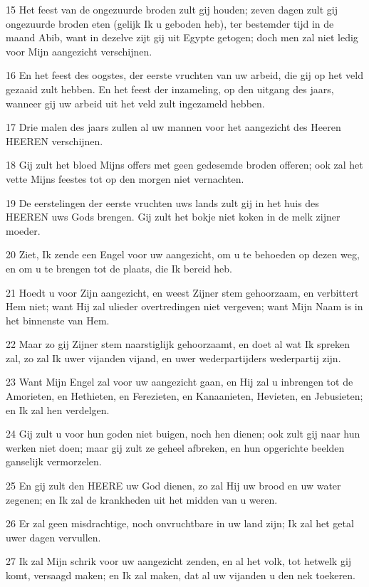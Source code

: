 \par 15 Het feest van de ongezuurde broden zult gij houden; zeven dagen zult gij ongezuurde broden eten (gelijk Ik u geboden heb), ter bestemder tijd in de maand Abib, want in dezelve zijt gij uit Egypte getogen; doch men zal niet ledig voor Mijn aangezicht verschijnen.
\par 16 En het feest des oogstes, der eerste vruchten van uw arbeid, die gij op het veld gezaaid zult hebben. En het feest der inzameling, op den uitgang des jaars, wanneer gij uw arbeid uit het veld zult ingezameld hebben.
\par 17 Drie malen des jaars zullen al uw mannen voor het aangezicht des Heeren HEEREN verschijnen.
\par 18 Gij zult het bloed Mijns offers met geen gedesemde broden offeren; ook zal het vette Mijns feestes tot op den morgen niet vernachten.
\par 19 De eerstelingen der eerste vruchten uws lands zult gij in het huis des HEEREN uws Gods brengen. Gij zult het bokje niet koken in de melk zijner moeder.
\par 20 Ziet, Ik zende een Engel voor uw aangezicht, om u te behoeden op dezen weg, en om u te brengen tot de plaats, die Ik bereid heb.
\par 21 Hoedt u voor Zijn aangezicht, en weest Zijner stem gehoorzaam, en verbittert Hem niet; want Hij zal ulieder overtredingen niet vergeven; want Mijn Naam is in het binnenste van Hem.
\par 22 Maar zo gij Zijner stem naarstiglijk gehoorzaamt, en doet al wat Ik spreken zal, zo zal Ik uwer vijanden vijand, en uwer wederpartijders wederpartij zijn.
\par 23 Want Mijn Engel zal voor uw aangezicht gaan, en Hij zal u inbrengen tot de Amorieten, en Hethieten, en Ferezieten, en Kanaanieten, Hevieten, en Jebusieten; en Ik zal hen verdelgen.
\par 24 Gij zult u voor hun goden niet buigen, noch hen dienen; ook zult gij naar hun werken niet doen; maar gij zult ze geheel afbreken, en hun opgerichte beelden ganselijk vermorzelen.
\par 25 En gij zult den HEERE uw God dienen, zo zal Hij uw brood en uw water zegenen; en Ik zal de krankheden uit het midden van u weren.
\par 26 Er zal geen misdrachtige, noch onvruchtbare in uw land zijn; Ik zal het getal uwer dagen vervullen.
\par 27 Ik zal Mijn schrik voor uw aangezicht zenden, en al het volk, tot hetwelk gij komt, versaagd maken; en Ik zal maken, dat al uw vijanden u den nek toekeren.

